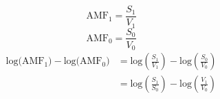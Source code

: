 \begin{equation} \label{eq:AMF1}
\textrm{AMF}_1 = \frac{S_1}{V_1}
\end{equation}
\begin{equation} \label{eq:AMF0}
\textrm{AMF}_0 = \frac{S_0}{V_0}
\end{equation}
\begin{equation} \label{eq:delta_AMF}
\begin{split}
\textrm{log(AMF$_1$)} - \textrm{log(AMF$_0$)} & = \textrm{log}(\frac{S_1}{V_1}) - \textrm{log}(\frac{S_0}{V_0}) \\
                                              & = \textrm{log}(\frac{S_1}{S_0}) - \textrm{log}(\frac{V_1}{V_0})
\end{split}
\end{equation}

